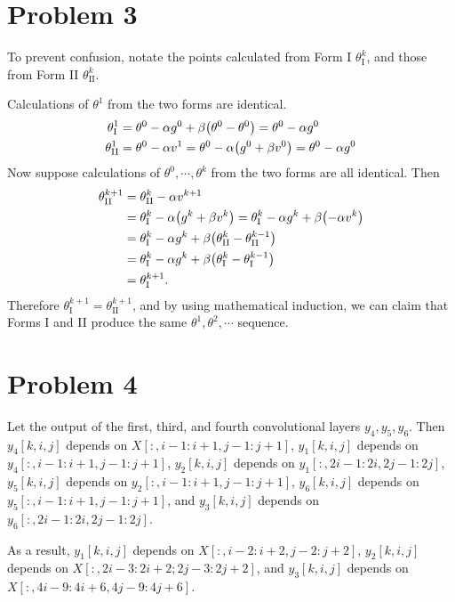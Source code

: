 \documentclass[10pt]{article}
\begin{document}
\section*{Problem 3}
To prevent confusion, notate the points calculated from Form I $\theta_{\mathrm{I}}^k$, and those from Form II $\theta_{\mathrm{II}}^k$.

\vspace{3mm}
Calculations of $\theta^1$ from the two forms are identical.
\begin{align*}
    \theta_{\mathrm{I}}^1 &= \theta^0 - \alpha g^0 + \beta\qty(\theta^0 - \theta^0) = \theta^0 - \alpha g^0 \\
    \theta_{\mathrm{II}}^1 &= \theta^0 - \alpha v^1 = \theta^0 - \alpha\qty(g^0 + \beta v^0) = \theta^0 - \alpha g^0
\end{align*}
Now suppose calculations of $\theta^0, \cdots , \theta^k$ from the two forms are all identical.
Then 
\begin{align*}
    \theta_{\mathrm{II}}^{k+1} &= \theta_{\mathrm{II}}^k - \alpha v^{k+1} \\
    &= \theta_{\mathrm{I}}^k - \alpha\qty(g^k + \beta v^k) = \theta_{\mathrm{I}}^k - \alpha g^k + \beta\qty(-\alpha v^k) \\
    &= \theta_{\mathrm{I}}^k - \alpha g^k + \beta\qty(\theta_{\mathrm{II}}^k - \theta_{\mathrm{II}}^{k-1}) \\
    &= \theta_{\mathrm{I}}^k - \alpha g^k + \beta\qty(\theta_{\mathrm{I}}^k - \theta_{\mathrm{I}}^{k-1}) \\
    &= \theta_{\mathrm{I}}^{k+1}.
\end{align*}
Therefore $\theta_{\mathrm{I}}^{k+1} = \theta_{\mathrm{II}}^{k+1}$, and by using mathematical induction, we can claim that Forms I and II produce the same $\theta^1, \theta^2, \cdots$ sequence.

\section*{Problem 4}
Let the output of the first, third, and fourth convolutional layers $y_4, y_5, y_6$.
Then $y_4[k, i, j]$ depends on $X[:, i-1:i+1, j-1:j+1]$, $y_1[k, i, j]$ depends on $y_4[:, i-1:i+1, j-1:j+1]$, $y_2[k, i, j]$ depends on $y_1[:, 2i-1:2i, 2j-1:2j]$, $y_5[k,i,j]$ depends on $y_2[:, i-1:i+1, j-1:j+1]$, $y_6[k,i,j]$ depends on $y_5[:, i-1:i+1, j-1:j+1]$, and $y_3[k,i,j]$ depends on $y_6[:, 2i-1:2i, 2j-1:2j]$.

\vspace{3mm}
As a result, 
$y_1[k,i,j]$ depends on $X[:, i-2:i+2, j-2:j+2]$, $y_2[k,i,j]$ depends on $X[:, 2i-3:2i+2; 2j-3:2j+2]$, and $y_3[k,i,j]$ depends on $X[:, 4i-9:4i+6, 4j-9:4j+6]$.
\end{document}

